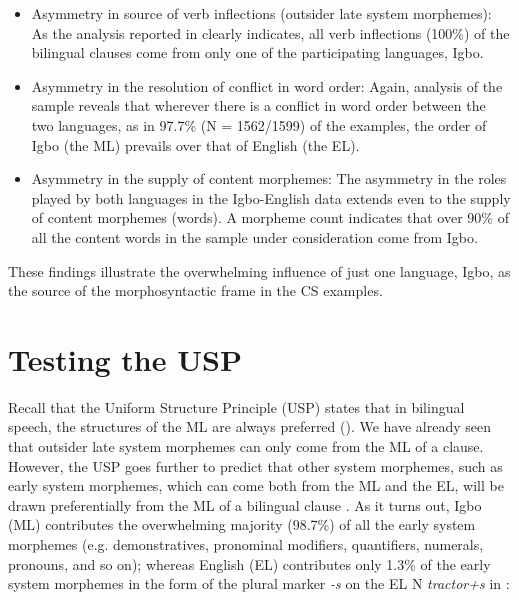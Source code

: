 \documentclass[output=paper]{langsci/langscibook}
\begin{document}
\begin{itemize}[noitemsep]
 \item Asymmetry in source of verb inflections (outsider late system morphemes): As the analysis reported in  clearly indicates, all verb inflections (100\%) of the bilingual clauses come from only one of the participating languages, Igbo.

 \item Asymmetry in the resolution of conflict in word order: Again, analysis of the sample reveals that wherever there is a conflict in word order between the two languages, as in 97.7\% (N = 1562/1599) of the examples, the order of Igbo (the ML) prevails over that of English (the EL). 

 \item Asymmetry in the supply of content morphemes: The asymmetry in the roles played by both languages in the Igbo-English data extends even to the supply of content morphemes (words). A morpheme count indicates that over 90\% of all the content words in the sample under consideration come from Igbo.
 
\end{itemize}
 
 

These findings illustrate the overwhelming influence of just one language, Igbo, as the source of the morphosyntactic frame in the CS examples. 

\section{Testing the USP}\label{sec:ihemere:7}

Recall that the Uniform Structure Principle (USP) states that in bilingual speech, the structures of the ML are always preferred (). We have already seen that outsider late system morphemes can only come from the ML of a clause. However, the USP goes further to predict that other system morphemes, such as early system morphemes, which can come both from the ML and the EL, will be drawn preferentially from the ML of a bilingual clause \citep[8-9]{MyersScotton2002}. As it turns out, Igbo (ML) contributes the overwhelming majority (98.7\%) of all the early system morphemes (e.g. demonstratives, pronominal modifiers, quantifiers, numerals, pronouns, and so on); whereas English (EL) contributes only 1.3\% of the early system morphemes in the form of the plural marker \textit{-s} on the EL N \textit{tractor+s} in : 
\end{document}
